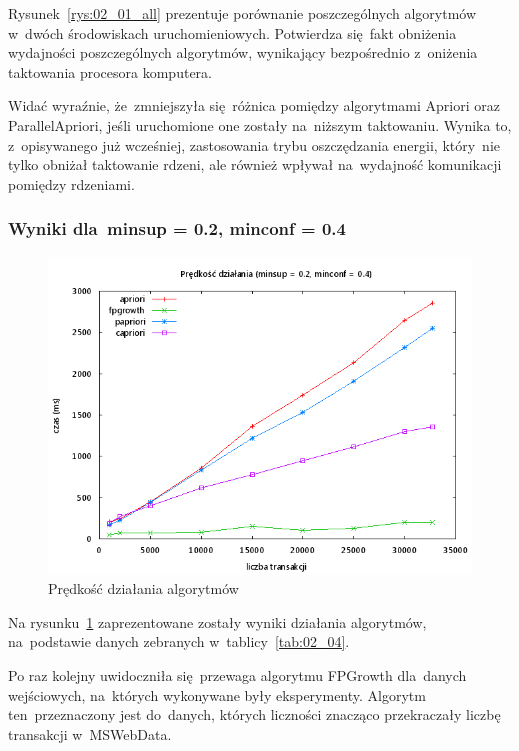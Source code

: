 Rysunek~\ref{rys:02_01_all} prezentuje porównanie poszczególnych algorytmów w~dwóch środowiskach uruchomieniowych. Potwierdza się~fakt obniżenia wydajności poszczególnych algorytmów, wynikający bezpośrednio z~oniżenia taktowania procesora komputera. 

Widać wyraźnie, że~zmniejszyła się~różnica pomiędzy algorytmami Apriori oraz ParallelApriori, jeśli uruchomione one zostały na~niższym taktowaniu. Wynika to, z~opisywanego już wcześniej, zastosowania trybu oszczędzania energii, który~nie tylko obniżał taktowanie rdzeni, ale również wpływał na~wydajność komunikacji pomiędzy rdzeniami.


\subsubsection{Wyniki dla~minsup = 0.2, minconf = 0.4}

\begin{figure}[H]
\centering
\includegraphics[width=1.1\textwidth]{figures/06/02_04.png}
\caption{Prędkość działania algorytmów\label{rys:02_04}}
\end{figure}

Na rysunku~\ref{rys:02_04} zaprezentowane zostały wyniki działania algorytmów, na~podstawie danych zebranych w~tablicy~\ref{tab:02_04}. 

Po raz kolejny uwidoczniła się~przewaga algorytmu FPGrowth dla~danych wejściowych, na~których wykonywane były eksperymenty. Algorytm ten~przeznaczony jest do~danych, których liczności znacząco przekraczały liczbę transakcji w~MSWebData.


